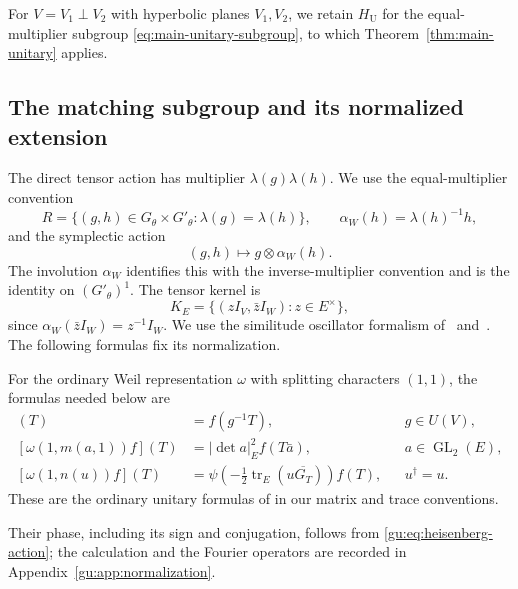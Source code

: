 For $V=V_1\perp V_2$ with hyperbolic planes $V_1,V_2$, we retain
$H_{\mathrm U}$ for the equal-multiplier subgroup
\eqref{eq:main-unitary-subgroup}, to which
Theorem~\ref{thm:main-unitary} applies.

\subsection{The matching subgroup and its normalized extension}
\label{gu:jac:oscillator-section}
The direct tensor action has multiplier $\lambda(g)\lambda(h)$. We use the
equal-multiplier convention
\[
 R=\{(g,h)\in G_\theta\times G'_\theta:\lambda(g)=\lambda(h)\},\qquad
 \alpha_W(h)=\lambda(h)^{-1}h,
\]
and the symplectic action
\begin{equation}\label{gu:jac:tensor-action}
 (g,h)\longmapsto g\otimes\alpha_W(h).
\end{equation}
The involution $\alpha_W$ identifies this with the inverse-multiplier
convention and is the identity on $(G'_\theta)^1$. The tensor kernel is
\begin{equation}\label{gu:jac:tensor-kernel}
 K_E=\{(zI_V,\bar zI_W):z\in E^\times\},
\end{equation}
since $\alpha_W(\bar zI_W)=z^{-1}I_W$.
We use the similitude oscillator formalism of~\cite[\S\S2--4]{ZhangSimilitude}
and~\cite[\S\S3, 6.1]{BGS}. The following formulas fix its normalization.

For the ordinary Weil representation $\omega$ with splitting characters
$(1,1)$, the formulas needed below are
\begin{align}
 [\omega(g,1)f](T)&=f(g^{-1}T), &&g\in U(V),
 \label{gu:jac:ordinary-g}\\
 [\omega(1,m(a,1))f](T)&=|\det a|_E^2f(T\bar a),
 &&a\in\operatorname{GL}_2(E),\label{gu:jac:ordinary-levi}\\
 [\omega(1,n(u))f](T)&=
 \psi\left(-\frac12\operatorname{tr}_E
                     (u\overline{G_T})\right)f(T),
 &&u^\dagger=u.\label{gu:jac:ordinary-n}
\end{align}
These are the ordinary unitary formulas of \cite[\S3.1]{ChenGan} in our matrix
and trace conventions.

Their phase, including its sign and conjugation, follows from
\eqref{gu:eq:heisenberg-action}; the calculation and the Fourier operators
are recorded in Appendix~\ref{gu:app:normalization}.

